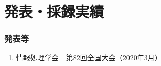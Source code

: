 \chapter*{発表・採録実績}


\subsection*{発表等}
\begin{enumerate}
\renewcommand{\labelenumi}{[\arabic{enumi}]}
    \item 情報処理学会　第82回全国大会（2020年3月）
\end{enumerate}